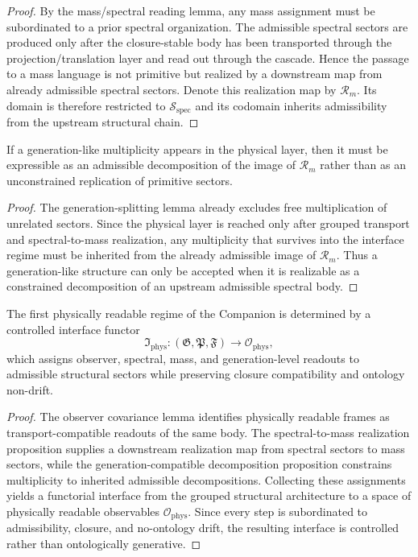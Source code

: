 \begin{proof}
By the mass/spectral reading lemma, any mass assignment must be subordinated to a prior spectral organization. The admissible spectral sectors are produced only after the closure-stable body has been transported through the projection/translation layer and read out through the cascade. Hence the passage to a mass language is not primitive but realized by a downstream map from already admissible spectral sectors. Denote this realization map by $\mathcal R_m$. Its domain is therefore restricted to $\mathcal S_{\mathrm{spec}}$ and its codomain inherits admissibility from the upstream structural chain.
\end{proof}

\begin{proposition}
\label{prop:generation-compatible-decomposition}
If a generation-like multiplicity appears in the physical layer, then it must be expressible as an admissible decomposition of the image of $\mathcal R_m$ rather than as an unconstrained replication of primitive sectors.
\end{proposition}

\begin{proof}
The generation-splitting lemma already excludes free multiplication of unrelated sectors. Since the physical layer is reached only after grouped transport and spectral-to-mass realization, any multiplicity that survives into the interface regime must be inherited from the already admissible image of $\mathcal R_m$. Thus a generation-like structure can only be accepted when it is realizable as a constrained decomposition of an upstream admissible spectral body.
\end{proof}

\begin{theorem}
\label{thm:controlled-physical-interface-functor}
The first physically readable regime of the Companion is determined by a controlled interface functor
\[
\mathfrak I_{\mathrm{phys}}:
(\mathfrak G,\mathfrak P,\mathfrak F)
\longrightarrow
\mathcal O_{\mathrm{phys}},
\]
which assigns observer, spectral, mass, and generation-level readouts to admissible structural sectors while preserving closure compatibility and ontology non-drift.
\end{theorem}

\begin{proof}
The observer covariance lemma identifies physically readable frames as transport-compatible readouts of the same body. The spectral-to-mass realization proposition supplies a downstream realization map from spectral sectors to mass sectors, while the generation-compatible decomposition proposition constrains multiplicity to inherited admissible decompositions. Collecting these assignments yields a functorial interface from the grouped structural architecture to a space of physically readable observables $\mathcal O_{\mathrm{phys}}$. Since every step is subordinated to admissibility, closure, and no-ontology drift, the resulting interface is controlled rather than ontologically generative.
\end{proof}

